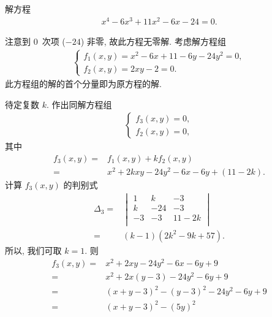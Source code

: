 \documentclass[%
    UTF8,%
    fontset=none,%
    punct=kaiming,%
    zihao=-4,%
    a4paper,%
    oneside,%
]{ctexbook}
\begin{document}
\begin{example}
    解方程
    \begin{align*}
        x^4 - 6x^3 + 11x^2 - 6x - 24 = 0.
    \end{align*}

    注意到 \(0\)~次项 (\(-24\)) 非零,
    故此方程无零解.
    考虑解方程组
    \begin{align*}
        \begin{cases}
            f_1 (x, y) = x^2 - 6x + 11 - 6y - 24y^2 = 0, \\
            f_2 (x, y) = 2xy - 2 = 0.
        \end{cases}
    \end{align*}
    此方程组的解的首个分量即为原方程的解.

    待定复数 \(k\).
    作出同解方程组
    \begin{align*}
        \begin{cases}
            f_3 (x, y) = 0, \\
            f_2 (x, y) = 0,
        \end{cases}
    \end{align*}
    其中
    \begin{align*}
        f_3 (x, y)
        = {} & f_1 (x, y) + kf_2 (x, y)                  \\
        = {} & x^2 + 2kxy - 24y^2 - 6x - 6y + (11 - 2k).
    \end{align*}
    计算 \(f_3 (x, y)\) 的判别式
    \begin{align*}
        \Delta_3
        = {} & \begin{vmatrix}
                   1  & k   & -3    \\
                   k  & -24 & -3    \\
                   -3 & -3  & 11-2k \\
               \end{vmatrix}        \\
        = {} & (k-1) (2k^2 - 9k + 57).
    \end{align*}
    所以, 我们可取 \(k = 1\).
    则
    \begin{align*}
        f_3 (x, y)
        = {} & x^2 + 2xy - 24y^2 - 6x - 6y + 9          \\
        = {} & x^2 + 2x(y-3) - 24y^2 - 6y + 9           \\
        = {} & (x + y - 3)^2 - (y-3)^2 - 24y^2 - 6y + 9 \\
        = {} & (x + y - 3)^2 - (5y)^2                   \\

\end{align*}
\end{example}
\end{document}
